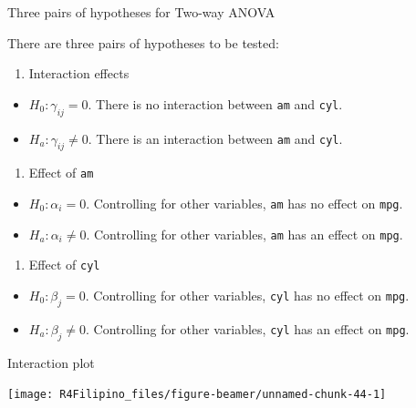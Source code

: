 \begin{frame}[fragile]{Three pairs of hypotheses for Two-way ANOVA}

There are three pairs of hypotheses to be tested:

\begin{enumerate}
\def\labelenumi{\arabic{enumi}.}
\tightlist
\item
  Interaction effects
\end{enumerate}

\begin{itemize}
\tightlist
\item
  \(H_0:\gamma_{ij} = 0\). There is no interaction between \texttt{am}
  and \texttt{cyl}.
\item
  \(H_a:\gamma_{ij} \neq 0\). There is an interaction between
  \texttt{am} and \texttt{cyl}.
\end{itemize}

\begin{enumerate}
\def\labelenumi{\arabic{enumi}.}
\setcounter{enumi}{1}
\tightlist
\item
  Effect of \texttt{am}
\end{enumerate}

\begin{itemize}
\tightlist
\item
  \(H_0:\alpha_{i} = 0\). Controlling for other variables, \texttt{am}
  has no effect on \texttt{mpg}.
\item
  \(H_a:\alpha_{i} \neq 0\). Controlling for other variables,
  \texttt{am} has an effect on \texttt{mpg}.
\end{itemize}

\begin{enumerate}
\def\labelenumi{\arabic{enumi}.}
\setcounter{enumi}{2}
\tightlist
\item
  Effect of \texttt{cyl}
\end{enumerate}

\begin{itemize}
\tightlist
\item
  \(H_0:\beta_{j} = 0\). Controlling for other variables, \texttt{cyl}
  has no effect on \texttt{mpg}.
\item
  \(H_a:\beta_{j} \neq 0\). Controlling for other variables,
  \texttt{cyl} has an effect on \texttt{mpg}.
\end{itemize}

\end{frame}

\begin{frame}[fragile]{Interaction plot}

\begin{Shaded}
\begin{Highlighting}[]
\end{Highlighting}
\end{Shaded}

\begin{center}\texttt{[image: R4Filipino\_files/figure-beamer/unnamed-chunk-44-1]} \end{center}

\end{frame}

